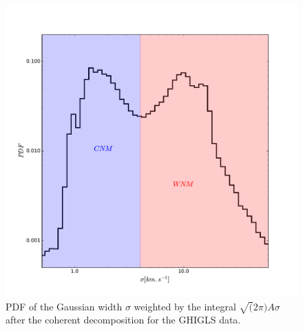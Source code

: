 \documentclass[traditabstract]{aa}
\begin{document}
\begin{figure}
  \includegraphics[width=\linewidth]{Figures/PDF_sigma_over_A.pdf}
  \caption{\label{PDF_sigma} PDF of the Gaussian width $\sigma$ weighted by the integral $\sqrt(2\pi)A\sigma$ after the coherent decomposition for the GHIGLS data.}
\end{figure}

\end{document}
